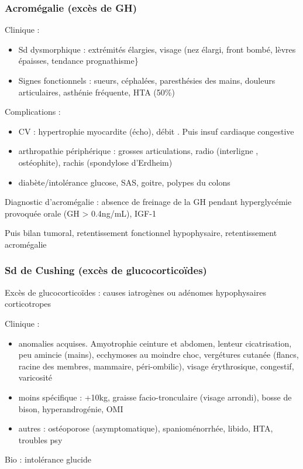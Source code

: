 \documentclass[11pt]{article}
\begin{document}
\subsubsection{Acromégalie (excès de \gls{GH})}
\label{sec:org44b1807}
Clinique :
\begin{itemize}
\item Sd dysmorphique : extrémités élargies, visage (nez élargi, front bombé, lèvres épaisses, tendance prognathisme\}
\item Signes fonctionnels : sueurs, céphalées, paresthésies des mains, douleurs articulaires, asthénie fréquente, HTA (50\%)
\end{itemize}

Complications :
\begin{itemize}
\item CV : hypertrophie myocardite (écho), débit \inc. Puis insuf cardiaque
congestive
\item arthropathie périphérique : grosses articulations, radio (interligne \inc,
ostéophite), rachis (spondylose d'Erdheim)
\item diabète/intolérance glucose, SAS, goitre, polypes du colons
\end{itemize}

\begin{tcolorbox}
Diagnostic d'acromégalie : absence de freinage de la GH pendant hyperglycémie provoquée
  orale (GH > 0.4ng/mL), \inc IGF-1\footnotemark
\end{tcolorbox}

Puis bilan tumoral, retentissement fonctionnel hypophysaire, retentissement
acromégalie

\subsubsection{Sd de Cushing (excès de glucocorticoïdes)}
\label{sec:org7013e0e}
Excès de glucocorticoïdes : causes iatrogènes ou adénomes hypophysaires
corticotropes

Clinique :
\begin{itemize}
\item anomalies acquises. Amyotrophie ceinture et abdomen, lenteur cicatrisation,
peu amincie (mains), ecchymoses au moindre choc, vergétures cutanée (flancs,
racine des membres, mammaire, péri-ombilic), visage érythrosique, congestif,
varicosité
\item moins spécifique : +10kg, graisse facio-tronculaire (visage arrondi), bosse de
bison, hyperandrogénie, OMI
\item autres : ostéoporose (asymptomatique), spanioménorrhée, \dec libido, HTA,
troubles psy
\end{itemize}
Bio : intolérance glucide
\end{document}
